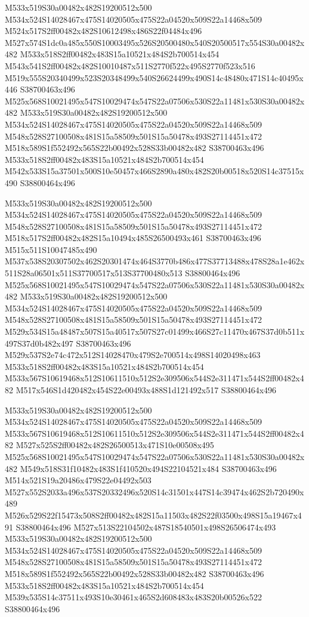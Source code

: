 \documentclass{article}
\begin{document}
\begin{multicols}{2}
M533x519S30a00482x482S19200512x500 M534x524S14028467x475S14020505x475S22a04520x509S22a14468x509 M524x517S2ff00482x482S10612498x486S22f04484x496 M527x574S1dc0a485x550S10003495x526S20500480x540S20500517x554S30a00482x482 M533x518S2ff00482x483S15a10521x484S2b700514x454 M543x541S2ff00482x482S10010487x511S2770f522x495S2770f523x516 M519x555S20340499x523S20348499x540S26624499x490S14c48480x471S14c40495x446 S38700463x496 M525x568S10021495x547S10029474x547S22a07506x530S22a11481x530S30a00482x482 M533x519S30a00482x482S19200512x500 M534x524S14028467x475S14020505x475S22a04520x509S22a14468x509 M548x528S27100508x481S15a58509x501S15a50478x493S27114451x472 M518x589S1f552492x565S22b00492x528S33b00482x482 S38700463x496 M533x518S2ff00482x483S15a10521x484S2b700514x454 M542x533S15a37501x500S10e50457x466S2890a480x482S20b00518x520S14c37515x490 S38800464x496

M533x519S30a00482x482S19200512x500 M534x524S14028467x475S14020505x475S22a04520x509S22a14468x509 M548x528S27100508x481S15a58509x501S15a50478x493S27114451x472 M518x517S2ff00482x482S15a10494x485S26500493x461 S38700463x496 M515x511S10047485x490 M537x538S20307502x462S20301474x464S3770b486x477S37713488x478S28a1e462x511S28a06501x511S37700517x513S37700480x513 S38800464x496 M525x568S10021495x547S10029474x547S22a07506x530S22a11481x530S30a00482x482 M533x519S30a00482x482S19200512x500 M534x524S14028467x475S14020505x475S22a04520x509S22a14468x509 M548x528S27100508x481S15a58509x501S15a50478x493S27114451x472 M529x534S15a48487x507S15a40517x507S27c01499x466S27c11470x467S37d0b511x497S37d0b482x497 S38700463x496 M529x537S2e74c472x512S14028470x479S2e700514x498S14020498x463 M533x518S2ff00482x483S15a10521x484S2b700514x454 M533x567S10619468x512S10611510x512S2e309506x544S2e311471x544S2ff00482x482 M517x546S1d420482x454S22e00493x488S1d121492x517 S38800464x496

M533x519S30a00482x482S19200512x500 M534x524S14028467x475S14020505x475S22a04520x509S22a14468x509 M533x567S10619468x512S10611510x512S2e309506x544S2e311471x544S2ff00482x482 M527x525S2ff00482x482S26500513x471S10e00508x495 M525x568S10021495x547S10029474x547S22a07506x530S22a11481x530S30a00482x482 M549x518S31f10482x483S1f410520x494S22104521x484 S38700463x496 M514x521S19a20486x479S22e04492x503 M527x552S2033a496x537S20332496x520S14c31501x447S14c39474x462S2b720490x489 M526x529S22f15473x508S2ff00482x482S15a11503x482S22f03500x498S15a19467x491 S38800464x496 M527x513S22104502x487S18540501x498S26506474x493 M533x519S30a00482x482S19200512x500 M534x524S14028467x475S14020505x475S22a04520x509S22a14468x509 M548x528S27100508x481S15a58509x501S15a50478x493S27114451x472 M518x589S1f552492x565S22b00492x528S33b00482x482 S38700463x496 M533x518S2ff00482x483S15a10521x484S2b700514x454 M539x535S14c37511x493S10e30461x465S2d608483x483S20b00526x522 S38800464x496


\end{multicols}
\end{document}
